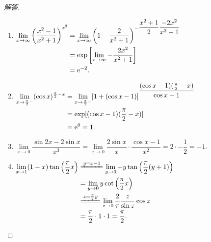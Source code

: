 \documentclass[UTF8,a4paper,11pt,twoside]{book}
\newcommand{\e}{\mathrm e}
\begin{document}
\begin{enumerate}
\begin{proof}[解答]
\begin{enumerate}[(1)]
			      \item $\begin{aligned}[t]
					            \lim\limits_{x\to\infty} \left(\dfrac{x^2-1}{x^2+1}\right)^{x^2} & = \lim\limits_{x\to\infty} \left(1-\dfrac{2}{x^2+1}\right)^{-\dfrac{x^2+1}{2}\dfrac{-2x^2}{x^2+1}} \\
					                                                                             & ={\rm exp}\left[\lim\limits_{x\to\infty} -\dfrac{2x^2}{x^2+1}\right]                               \\
					                                                                             & =\e^{-2}.
				            \end{aligned}$

			      \item $\begin{aligned}[t]
					            \lim\limits_{x\to\frac{\pi}{2}^{-}} (\cos{x})^{\frac{\pi}{2}-x} & = \lim\limits_{x\to\frac{\pi}{2}^{-}} [1+(\cos{x}-1)]^{\dfrac{(\cos{x}-1)(\frac{\pi}{2}-x)}{\cos{x}-1}} \\
					                                                                            & = {\rm exp}[(\cos{x}-1)(\frac{\pi}{2}-x)]                                                               \\
					                                                                            & = \e^0=1.
				            \end{aligned}$

			      \item $\lim\limits_{x\to 0} \dfrac{\sin{2x}-2\sin{x}}{x^3} = \lim\limits_{x\to 0}\dfrac{2\sin{x}}{x}\cdot\dfrac{\cos{x}-1}{x^2}=2\cdot -\dfrac{1}{2}=-1$.

			      \item $\begin{aligned}[t]
					            \lim\limits_{x\to 1} (1-x)\tan\left(\dfrac{\pi}{2}x\right) & \xlongequal{y=x-1} \lim\limits_{y\to 0} -y\tan\left(\dfrac{\pi}{2}(y+1)\right)             \\
					                                                                       & = \lim\limits_{y\to 0} y\cot\left(\dfrac{\pi}{2}x\right)                                   \\
					                                                                       & \xlongequal{z=\frac{\pi}{2}y} \lim\limits_{z\to 0} \dfrac{2}{\pi}\dfrac{z}{\sin{z}}\cos{z} \\
					                                                                       & =\dfrac{\pi}{2}\cdot 1\cdot 1= \dfrac{\pi}{2}.
				            \end{aligned}$
		      \end{enumerate}
	      \end{proof}


\end{enumerate}
\end{document}
